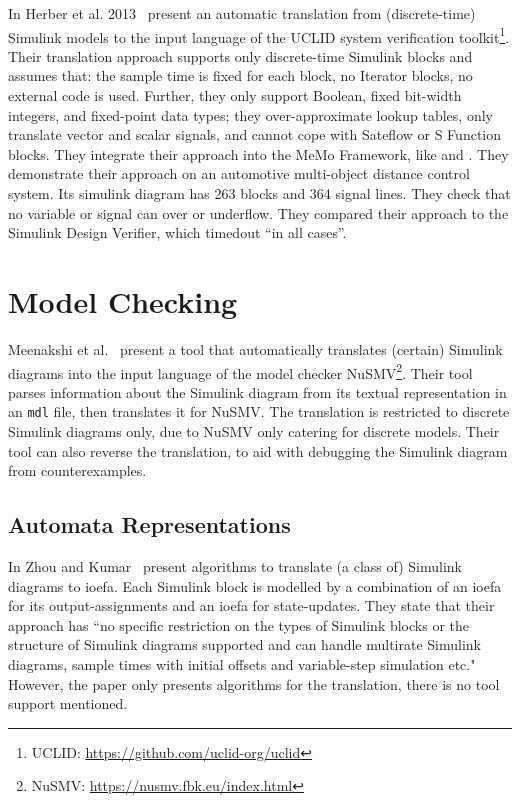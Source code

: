 In Herber et al. 2013~\cite{herber_bit-precise_2013} present an automatic translation from (discrete-time) Simulink models to the input language of the UCLID system verification toolkit\footnote{UCLID: \url{https://github.com/uclid-org/uclid}}. Their translation approach supports only discrete-time Simulink blocks and assumes that: the sample time is fixed for each block, no Iterator blocks, no external code is used. Further, they only support Boolean, fixed bit-width integers, and fixed-point data types; they over-approximate lookup tables, only translate vector and scalar signals, and cannot cope with Sateflow or S Function blocks. They integrate their approach into the MeMo Framework, like \cite{reicherdt_formal_2014} and \cite{liebrenz_deductive_2018}. They demonstrate their approach on an automotive multi-object distance control system. Its simulink diagram has 263 blocks and 364 signal lines. They check that no variable or signal can over or underflow. They compared their approach to the Simulink Design Verifier, which timedout ``in all cases''. 

\section{Model Checking}
\label{sec:modelChecking}

Meenakshi et al.~\cite{meenakshi_tool_2006} present a tool that automatically translates (certain) Simulink diagrams into the input language of the model checker NuSMV\footnote{NuSMV: \url{https://nusmv.fbk.eu/index.html}}. Their tool parses information about the Simulink diagram from its textual representation in an \texttt{mdl} file, then translates it for NuSMV. The translation is restricted to discrete Simulink diagrams only, due to NuSMV only catering for discrete models. Their tool can also reverse the translation, to aid with debugging the Simulink diagram from counterexamples. 

\subsection{Automata Representations}

In Zhou and Kumar~\cite{zhou_semantic_2012} present algorithms to translate (a class of) Simulink diagrams to \gls{ioefa}. Each Simulink block is modelled by a combination of an \gls{ioefa} for its output-assignments and an \gls{ioefa} for state-updates. They state that their approach has ``no specific restriction on the types of Simulink blocks or the structure of Simulink diagrams supported and can handle multirate Simulink diagrams, sample times with initial offsets and variable-step simulation etc." However, the paper only presents algorithms for the translation, there is no tool support mentioned.

